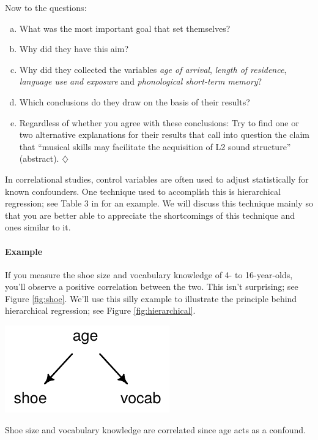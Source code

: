 \documentclass[a4paper]{tufte-book}\usepackage[]{graphicx}\usepackage[]{xcolor}
\newcommand*{\parend}[1][$\diamondsuit$]{%
\leavevmode\unskip\penalty9999 \hbox{}\nobreak\hfill
    \quad\hbox{#1}%
}
\begin{document}
\medskip

Now to the questions:
\begin{enumerate}[(a)]
  \item What was the most important goal that \citet{Slevc2006} set themselves?

  \item Why did they have this aim?

  \item Why did they collected the variables \textit{age of arrival},
  \textit{length of residence}, \textit{language use and exposure}
  and \textit{phonological short-term memory}?

  \item Which conclusions do they draw on the basis of their results?

  \item Regardless of whether you agree with these conclusions: Try
  to find one or two alternative explanations for their results
  that call into question the claim that ``musical skills may
  facilitate the acquisition of L2 sound structure'' (abstract).\parend
\end{enumerate}

\medskip

In correlational studies, control variables are often used to
adjust statistically for known confounders.
One technique used to accomplish this is hierarchical regression;
see Table 3 in \citet{Slevc2006} for an example.
We will discuss this technique mainly so that you
are better able to appreciate the shortcomings of this
technique and ones similar to it.

\paragraph{Example}
If you measure the shoe size and vocabulary knowledge of 4- to 16-year-olds,
you'll observe a positive correlation between the two. This isn't surprising;
see Figure \ref{fig:shoe}.
We'll use this silly example to illustrate the principle behind
hierarchical regression; see Figure \vref{fig:hierarchical}.

\begin{marginfigure}
  \includegraphics{figure/shoe}
  \caption{Shoe size and vocabulary knowledge are correlated since age
  acts as a confound.}
  \label{fig:shoe}
\end{marginfigure}
\end{document}
